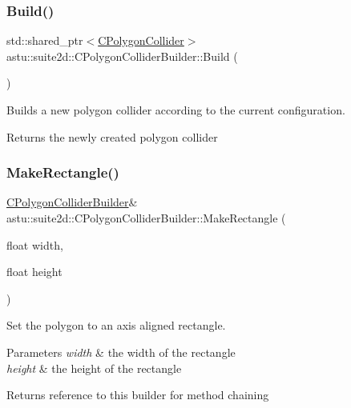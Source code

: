 \subsubsection{\texorpdfstring{Build()}{Build()}}
{\footnotesize\ttfamily std\+::shared\+\_\+ptr$<$\hyperlink{classastu_1_1suite2d_1_1CPolygonCollider}{C\+Polygon\+Collider}$>$ astu\+::suite2d\+::\+C\+Polygon\+Collider\+Builder\+::\+Build (\begin{DoxyParamCaption}{ }\end{DoxyParamCaption})}

Builds a new polygon collider according to the current configuration.

\begin{DoxyReturn}{Returns}
the newly created polygon collider 
\end{DoxyReturn}
\mbox{\label{classastu_1_1suite2d_1_1CPolygonColliderBuilder_a05b7196e63bc3466a31fefc6df121a58}} 
\subsubsection{\texorpdfstring{Make\+Rectangle()}{MakeRectangle()}}
{\footnotesize\ttfamily \hyperlink{classastu_1_1suite2d_1_1CPolygonColliderBuilder}{C\+Polygon\+Collider\+Builder}\& astu\+::suite2d\+::\+C\+Polygon\+Collider\+Builder\+::\+Make\+Rectangle (\begin{DoxyParamCaption}\item[{float}]{width,  }\item[{float}]{height }\end{DoxyParamCaption})}

Set the polygon to an axis aligned rectangle.


\begin{DoxyParams}{Parameters}
{\em width} & the width of the rectangle \\
\hline
{\em height} & the height of the rectangle \\
\hline
\end{DoxyParams}
\begin{DoxyReturn}{Returns}
reference to this builder for method chaining 
\end{DoxyReturn}
\mbox{\label{classastu_1_1suite2d_1_1CPolygonColliderBuilder_a5b4a20190025ac8a54e4c6da2ef55cf7}} 
